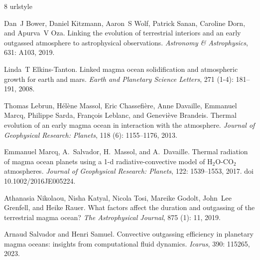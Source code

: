 \documentclass[referee]{aa}
\begin{document}


\begin{thebibliography}{8}
\providecommand{\natexlab}[1]{#1}
\providecommand{\url}[1]{\texttt{#1}}
\expandafter\ifx\csname urlstyle\endcsname\relax
  \providecommand{\doi}[1]{doi: #1}\else
  \providecommand{\doi}{doi: \begingroup \urlstyle{rm}\Url}\fi

Dan~J Bower, Daniel Kitzmann, Aaron~S Wolf, Patrick Sanan, Caroline Dorn, and
  Apurva~V Oza.
\newblock Linking the evolution of terrestrial interiors and an early outgassed
  atmosphere to astrophysical observations.
\newblock \emph{Astronomy \& Astrophysics}, 631: A103, 2019.

Linda~T Elkins-Tanton.
\newblock Linked magma ocean solidification and atmospheric growth for earth
  and mars.
\newblock \emph{Earth and Planetary Science Letters}, 271
  (1-4): 181--191, 2008.

Thomas Lebrun, H{\'e}l{\`e}ne Massol, Eric Chassefi{\`e}re, Anne Davaille,
  Emmanuel Marcq, Philippe Sarda, Fran{\c{c}}ois Leblanc, and Genevi{\`e}ve
  Brandeis.
\newblock Thermal evolution of an early magma ocean in interaction with the
  atmosphere.
\newblock \emph{Journal of Geophysical Research: Planets}, 118
  (6): 1155--1176, 2013.

Emmanuel Marcq, A.~Salvador, H.~Massol, and A.~Davaille.
\newblock Thermal radiation of magma ocean planets using a 1-d
  radiative-convective model of {H$_2$O-CO$_2$} atmospheres.
\newblock \emph{Journal of Geophysical Research: Planets}, 122:
  1539--1553, 2017.
\newblock doi 10.1002/2016JE005224.

Athanasia Nikolaou, Nisha Katyal, Nicola Tosi, Mareike Godolt, John~Lee
  Grenfell, and Heike Rauer.
\newblock What factors affect the duration and outgassing of the terrestrial
  magma ocean?
\newblock \emph{The Astrophysical Journal}, 875 (1): 11,
  2019.

Arnaud Salvador and Henri Samuel.
\newblock Convective outgassing efficiency in planetary magma oceans: insights
  from computational fluid dynamics.
\newblock \emph{Icarus}, 390: 115265, 2023.


\end{thebibliography}
\end{document}
